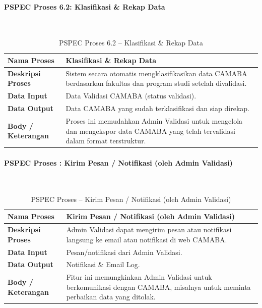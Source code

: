 \paragraph{PSPEC Proses 6.2: Klasifikasi \& Rekap Data}~\\
\begin{longtable}{|p{}|p{}|}
	\caption{PSPEC Proses 6.2 -- Klasifikasi \& Rekap Data}
	\label{table:3.pspec62}\\
	\hline
	\textbf{Nama Proses} & Klasifikasi \& Rekap Data \\
	\hline
	\textbf{Deskripsi Proses} & Sistem secara otomatis mengklasifikasikan data CAMABA berdasarkan fakultas dan program studi setelah divalidasi. \\
	\hline
	\textbf{Data Input} & Data Validasi CAMABA (status validasi). \\
	\hline
	\textbf{Data Output} & Data CAMABA yang sudah terklasifikasi dan siap direkap. \\
	\hline
	\textbf{Body / Keterangan} & Proses ini memudahkan Admin Validasi untuk mengelola dan mengekspor data CAMABA yang telah tervalidasi dalam format terstruktur. \\
	\hline
\end{longtable}


\paragraph{PSPEC Proses : Kirim Pesan / Notifikasi (oleh Admin Validasi)}~\\
\begin{longtable}{|p{}|p{}|}
	\caption{PSPEC Proses  -- Kirim Pesan / Notifikasi (oleh Admin Validasi)}
	\label{table:3.pspec}\\
	\hline
	\textbf{Nama Proses} & Kirim Pesan / Notifikasi (oleh Admin Validasi) \\
	\hline
	\textbf{Deskripsi Proses} & Admin Validasi dapat mengirim pesan atau notifikasi langsung ke email atau notifikasi di web CAMABA. \\
	\hline
	\textbf{Data Input} & Pesan/notifikasi dari Admin Validasi. \\
	\hline
	\textbf{Data Output} & Notifikasi \& Email Log. \\
	\hline
	\textbf{Body / Keterangan} & Fitur ini memungkinkan Admin Validasi untuk berkomunikasi dengan CAMABA, misalnya untuk meminta perbaikan data yang ditolak. \\
	\hline
\end{longtable}


